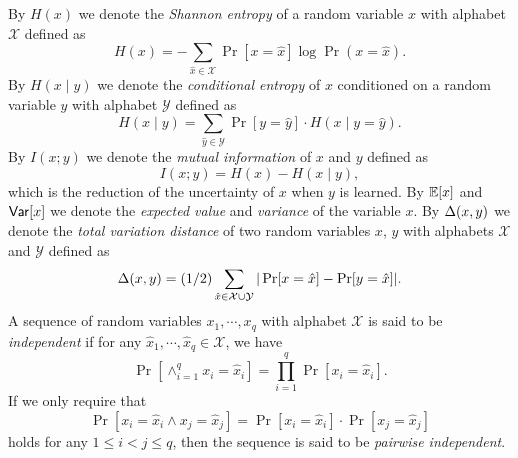 By $H(x)$ we denote the \emph{Shannon entropy} of a random variable $x$ with alphabet $\mathcal{X}$ defined as
	$$H(x) = -\sum_{\hat x \in \mathcal{X}} \Pr[x=\hat x] \log \Pr(x=\hat x).$$
By $H(x\mid y)$ we denote the \emph{conditional entropy} of $x$ conditioned on a random variable $y$ with alphabet $\mathcal Y$ defined as
	$$
	H(x\mid y) = \sum_{\hat y \in \mathcal{Y}}\Pr[y=\hat y]\cdot H(x\mid y=\hat y).
	$$
By $I(x;y)$ we denote the \emph{mutual information} of $x$ and $y$ defined as $$I(x;y) = H(x) - H(x \mid y),$$ which is the reduction of the uncertainty of $x$ when $y$ is learned.
By $\mathbb E[x]$ and $\mathsf{Var}[x]$ we denote the \emph{expected value} and \emph{variance} of the variable $x$.
By $\Delta(x, y)$ we denote the \emph{total variation distance} of two random variables $x$, $y$ with alphabets $\mathcal{X}$ and $\mathcal{Y}$ defined as 
	$$ \Delta(x,y) = (1/2)\sum_{\hat{x} \in \mathcal{X} \cup \mathcal{Y}}|\Pr[x = \hat{x}]-\Pr[y = \hat{x}]|.$$
	A sequence of random variables $x_1,\cdots,x_q$ with alphabet $\mathcal X$ is said to be \emph{independent} if for any $\hat x_1,\cdots, \hat x_q \in \mathcal X$, we have
	$$\Pr[\wedge_{i=1}^q x_i = \hat x_i] = \prod_{i=1}^q\Pr[x_i = \hat x_i].$$
	 If we only require that 
	$$\Pr[x_i = \hat x_i\land x_j = \hat x_j] = \Pr[x_i = \hat x_i]\cdot \Pr[x_j = \hat x_j]$$
	 holds for any $1\leq i<j\leq q$, then the sequence is said to be \emph{pairwise independent}.
	
%

